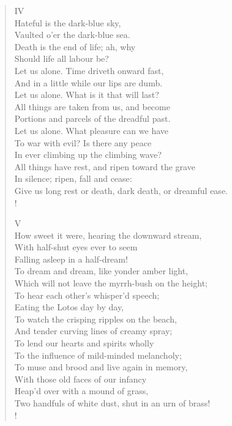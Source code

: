 \documentclass[10pt]{memoir}
\begin{document}
\begin{verse}
IV\\
Hateful is the dark-blue sky,\\
Vaulted o'er the dark-blue sea.\\
Death is the end of life; ah, why\\
Should life all labour be?\\
Let us alone. Time driveth onward fast,\\
And in a little while our lips are dumb.\\
Let us alone. What is it that will last?\\
All things are taken from us, and become\\
Portions and parcels of the dreadful past.\\
Let us alone. What pleasure can we have\\
To war with evil? Is there any peace\\
In ever climbing up the climbing wave?\\
All things have rest, and ripen toward the grave\\
In silence; ripen, fall and cease:\\
Give us long rest or death, dark death, or dreamful ease.\\!

V\\
How sweet it were, hearing the downward stream,\\
With half-shut eyes ever to seem\\
Falling asleep in a half-dream!\\
To dream and dream, like yonder amber light,\\
Which will not leave the myrrh-bush on the height;\\
To hear each other's whisper'd speech;\\
Eating the Lotos day by day,\\
To watch the crisping ripples on the beach,\\
And tender curving lines of creamy spray;\\
To lend our hearts and spirits wholly\\
To the influence of mild-minded melancholy;\\
To muse and brood and live again in memory,\\
With those old faces of our infancy\\
Heap'd over with a mound of grass,\\
Two handfuls of white dust, shut in an urn of brass!\\!


\end{verse}
\end{document}
